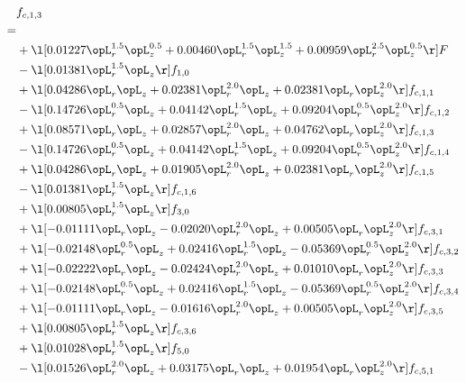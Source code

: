 \begin{alignat}{2} 
\label{eq:f_13_1} 
& f_{c,1,3} \nonumber \\ 
 = \\ 
& + \l[  0.01227 \opL_r^{1.5} \opL_z^{0.5} +  0.00460 \opL_r^{1.5} \opL_z^{1.5} +  0.00959 \opL_r^{2.5} \opL_z^{0.5}  \r] F \nonumber \\ 
& - \l[  0.01381 \opL_r^{1.5} \opL_z  \r] f_{1,0} \nonumber \\ 
& + \l[  0.04286 \opL_r \opL_z +  0.02381 \opL_r^{2.0} \opL_z +  0.02381 \opL_r \opL_z^{2.0}  \r] f_{c,1,1} \nonumber \\ 
& - \l[  0.14726 \opL_r^{0.5} \opL_z +  0.04142 \opL_r^{1.5} \opL_z +  0.09204 \opL_r^{0.5} \opL_z^{2.0}  \r] f_{c,1,2} \nonumber \\ 
& + \l[  0.08571 \opL_r \opL_z +  0.02857 \opL_r^{2.0} \opL_z +  0.04762 \opL_r \opL_z^{2.0}  \r] f_{c,1,3} \nonumber \\ 
& - \l[  0.14726 \opL_r^{0.5} \opL_z +  0.04142 \opL_r^{1.5} \opL_z +  0.09204 \opL_r^{0.5} \opL_z^{2.0}  \r] f_{c,1,4} \nonumber \\ 
& + \l[  0.04286 \opL_r \opL_z +  0.01905 \opL_r^{2.0} \opL_z +  0.02381 \opL_r \opL_z^{2.0}  \r] f_{c,1,5} \nonumber \\ 
& - \l[  0.01381 \opL_r^{1.5} \opL_z  \r] f_{c,1,6} \nonumber \\ 
& + \l[  0.00805 \opL_r^{1.5} \opL_z  \r] f_{3,0} \nonumber \\ 
& + \l[  -0.01111 \opL_r \opL_z   -0.02020 \opL_r^{2.0} \opL_z +  0.00505 \opL_r \opL_z^{2.0}  \r] f_{c,3,1} \nonumber \\ 
& + \l[  -0.02148 \opL_r^{0.5} \opL_z +  0.02416 \opL_r^{1.5} \opL_z   -0.05369 \opL_r^{0.5} \opL_z^{2.0}  \r] f_{c,3,2} \nonumber \\ 
& + \l[  -0.02222 \opL_r \opL_z   -0.02424 \opL_r^{2.0} \opL_z +  0.01010 \opL_r \opL_z^{2.0}  \r] f_{c,3,3} \nonumber \\ 
& + \l[  -0.02148 \opL_r^{0.5} \opL_z +  0.02416 \opL_r^{1.5} \opL_z   -0.05369 \opL_r^{0.5} \opL_z^{2.0}  \r] f_{c,3,4} \nonumber \\ 
& + \l[  -0.01111 \opL_r \opL_z   -0.01616 \opL_r^{2.0} \opL_z +  0.00505 \opL_r \opL_z^{2.0}  \r] f_{c,3,5} \nonumber \\ 
& + \l[  0.00805 \opL_r^{1.5} \opL_z  \r] f_{c,3,6} \nonumber \\ 
& + \l[  0.01028 \opL_r^{1.5} \opL_z  \r] f_{5,0} \nonumber \\ 
& - \l[  0.01526 \opL_r^{2.0} \opL_z +  0.03175 \opL_r \opL_z +  0.01954 \opL_r \opL_z^{2.0}  \r] f_{c,5,1} \nonumber \\ 

\end{alignat}
